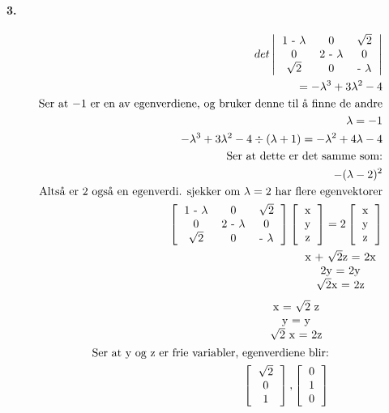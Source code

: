 \documentclass[11pt, A4paper,norsk]{article}
\begin{document}
		\paragraph{3.}
			\begin{align}
det \left| \begin{tabular} { ccc }
1 - $\lambda$ & 0 & $\sqrt{2}$ \\
0 & 2 - $\lambda$ & 0 \\
$\sqrt{2}$ & 0 & - $\lambda$
\end{tabular} \right| \\
= - \lambda^3 + 3 \lambda^2 - 4 \\
\text{Ser at $-1$ er en av egenverdiene, og bruker denne til å finne de andre} \nonumber \\
\lambda = - 1 \\
- \lambda^3 + 3 \lambda^2 - 4 \div (\lambda + 1) = - \lambda^2 + 4 \lambda - 4 \\
\text{Ser at dette er det samme som:} \nonumber \\
- (\lambda - 2)^2 \\
\text{Altså er $2$ også en egenverdi. sjekker om $\lambda = 2$ har flere egenvektorer} \nonumber \\
\left[ \begin{tabular} { ccc }
1 - $\lambda$ & 0 & $\sqrt{2}$ \\
0 & 2 - $\lambda$ & 0 \\
$\sqrt{2}$ & 0 & - $\lambda$
\end{tabular} \right]
\left[ \begin{tabular} { c }
x \\
y \\
z
\end{tabular} \right] = 2
\left[ \begin{tabular} { c }
x \\
y \\
z
\end{tabular} \right] \\
\begin{tabular} { c }
x + $\sqrt{2}$z = 2x \\
2y = 2y \\
$\sqrt{2}$x = 2z
\end{tabular}
			\end{align}
			\begin{align}
\begin{tabular} { c }
x = $\sqrt{2}$ z \\
y = y \\
$\sqrt{2}$ x = 2z
\end{tabular} \\
\text{Ser at y og z er frie variabler, egenverdiene blir:} \nonumber \\
\left[ \begin{tabular} { c }
$\sqrt{2}$ \\
0 \\
1
\end{tabular} \right], 
\left[ \begin{tabular} { c }
0 \\
1 \\
0
\end{tabular} \right]
			\end{align}
\end{document}

